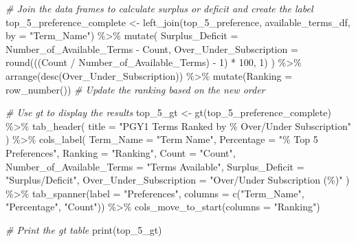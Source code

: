 \documentclass[
]{article}
\newenvironment{Shaded}{\begin{snugshade}}{\end{snugshade}}
\newcommand{\AttributeTok}[1]{\textcolor[rgb]{0.77,0.63,0.00}{#1}}
\newcommand{\CommentTok}[1]{\textcolor[rgb]{0.56,0.35,0.01}{\textit{#1}}}
\newcommand{\DecValTok}[1]{\textcolor[rgb]{0.00,0.00,0.81}{#1}}
\newcommand{\FunctionTok}[1]{\textcolor[rgb]{0.00,0.00,0.00}{#1}}
\newcommand{\NormalTok}[1]{#1}
\newcommand{\OtherTok}[1]{\textcolor[rgb]{0.56,0.35,0.01}{#1}}
\newcommand{\SpecialCharTok}[1]{\textcolor[rgb]{0.00,0.00,0.00}{#1}}
\newcommand{\StringTok}[1]{\textcolor[rgb]{0.31,0.60,0.02}{#1}}
\begin{document}
\begin{Shaded}
\begin{Highlighting}[]
\CommentTok{\# Join the data frames to calculate surplus or deficit and create the label}
\NormalTok{top\_5\_preference\_complete }\OtherTok{\textless{}{-}} \FunctionTok{left\_join}\NormalTok{(top\_5\_preference, available\_terms\_df, }\AttributeTok{by =} \StringTok{"Term\_Name"}\NormalTok{) }\SpecialCharTok{\%\textgreater{}\%}
  \FunctionTok{mutate}\NormalTok{(}
    \AttributeTok{Surplus\_Deficit =}\NormalTok{ Number\_of\_Available\_Terms }\SpecialCharTok{{-}}\NormalTok{ Count,}
    \AttributeTok{Over\_Under\_Subscription =} \FunctionTok{round}\NormalTok{(((Count }\SpecialCharTok{/}\NormalTok{ Number\_of\_Available\_Terms) }\SpecialCharTok{{-}} \DecValTok{1}\NormalTok{) }\SpecialCharTok{*} \DecValTok{100}\NormalTok{, }\DecValTok{1}\NormalTok{)}
\NormalTok{  ) }\SpecialCharTok{\%\textgreater{}\%}
  \FunctionTok{arrange}\NormalTok{(}\FunctionTok{desc}\NormalTok{(Over\_Under\_Subscription)) }\SpecialCharTok{\%\textgreater{}\%}
  \FunctionTok{mutate}\NormalTok{(}\AttributeTok{Ranking =} \FunctionTok{row\_number}\NormalTok{())  }\CommentTok{\# Update the ranking based on the new order}

\CommentTok{\# Use gt to display the results}
\NormalTok{top\_5\_gt }\OtherTok{\textless{}{-}} \FunctionTok{gt}\NormalTok{(top\_5\_preference\_complete) }\SpecialCharTok{\%\textgreater{}\%}
  \FunctionTok{tab\_header}\NormalTok{(}
    \AttributeTok{title =} \StringTok{"PGY1 Terms Ranked by \% Over/Under Subscription"}
\NormalTok{  ) }\SpecialCharTok{\%\textgreater{}\%}
  \FunctionTok{cols\_label}\NormalTok{(}
    \AttributeTok{Term\_Name =} \StringTok{"Term Name"}\NormalTok{,}
    \AttributeTok{Percentage =} \StringTok{"\% Top 5 Preferences"}\NormalTok{,}
    \AttributeTok{Ranking =} \StringTok{"Ranking"}\NormalTok{,}
    \AttributeTok{Count =} \StringTok{"Count"}\NormalTok{,}
    \AttributeTok{Number\_of\_Available\_Terms =} \StringTok{"Terms Available"}\NormalTok{,}
    \AttributeTok{Surplus\_Deficit =} \StringTok{"Surplus/Deficit"}\NormalTok{,}
    \AttributeTok{Over\_Under\_Subscription =} \StringTok{"Over/Under Subscription (\%)"}
\NormalTok{  ) }\SpecialCharTok{\%\textgreater{}\%}
  \FunctionTok{tab\_spanner}\NormalTok{(}\AttributeTok{label =} \StringTok{"Preferences"}\NormalTok{, }\AttributeTok{columns =} \FunctionTok{c}\NormalTok{(}\StringTok{"Term\_Name"}\NormalTok{, }\StringTok{"Percentage"}\NormalTok{, }\StringTok{"Count"}\NormalTok{)) }\SpecialCharTok{\%\textgreater{}\%}
  \FunctionTok{cols\_move\_to\_start}\NormalTok{(}\AttributeTok{columns =} \StringTok{"Ranking"}\NormalTok{)}

\CommentTok{\# Print the gt table}
\FunctionTok{print}\NormalTok{(top\_5\_gt)}
\end{Highlighting}
\end{Shaded}
\end{document}
